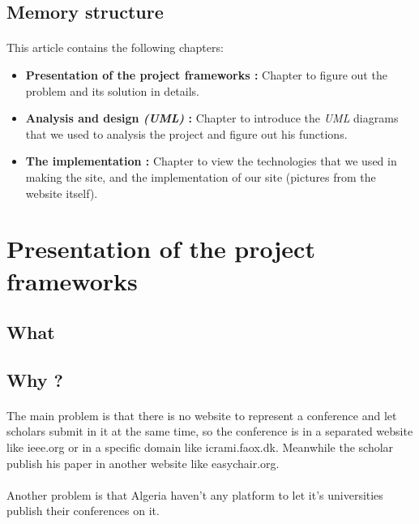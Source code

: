 \documentclass[12pt,a4paper]{article}
\begin{document}
	\subsection{Memory structure}
	\paragraph{}
	This article contains the following chapters:
	\begin{itemize}
		
		\item \textbf{Presentation of the project frameworks :}
		Chapter to figure out the problem and its solution in details.
		
		\item \textbf{Analysis and design \textit{(UML)} :}
		Chapter to introduce the \textit{UML} diagrams that we used to analysis the project and figure out his functions.
		
		\item \textbf{The implementation :}
		Chapter to view  the technologies that we used in making the site, and the implementation of our site (pictures from the website itself).
		
	\end{itemize}

	\clearpage
	\section{Presentation of the project frameworks}
		\subsection{What}
		\paragraph{}
		\subsection{Why ?}
		\paragraph{}
		The main problem is that there is no website to represent a conference and let scholars submit in it at the same time, so the conference is in a separated website like ieee.org or in a specific domain like icrami.faox.dk. Meanwhile the scholar publish his paper in another website like easychair.org.
		\paragraph{}
		Another problem is that Algeria haven't any platform to let it's universities publish their conferences on it.
\end{document}
